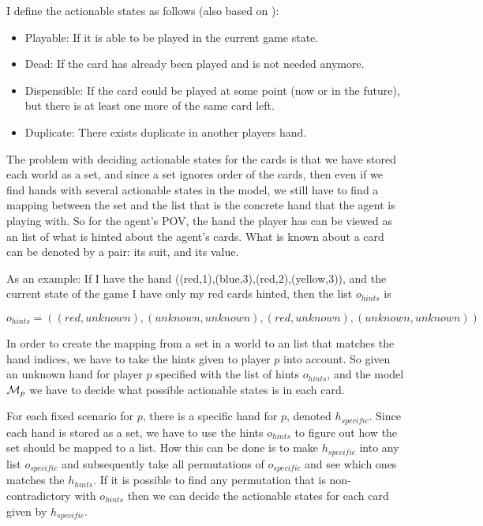 I define the actionable states as follows (also based on \cite{CoxEtAl2015}):
\begin{itemize}
	\item Playable: If it is able to be played in the current game state.
	\item Dead: If the card has already been played and is not needed anymore.
	\item Dispensible: If the card could be played at some point (now or in the future), but there is at least one more of the same card left.
	\item Duplicate: There exists duplicate in another players hand.
\end{itemize}

The problem with deciding actionable states for the cards is that we have stored each world as a set, and since a set ignores order of the cards, then even if we find hands with several actionable states in the model, we still have to find a mapping between the set and the list that is the concrete hand that the agent is playing with.
So for the agent's POV, the hand the player has can be viewed as an list of what is hinted about the agent's cards. What is known about a card can be denoted by a pair: its suit, and its value. 

As an example: If I have the hand ((red,1),(blue,3),(red,2),(yellow,3)), and the current state of the game I have only my red cards hinted, then the list $o_{hints}$ is

\[o_{hints} = ((red,unknown),(unknown,unknown),(red,unknown),(unknown,unknown))\]


In order to create the mapping from a set in a world to an list that matches the hand indices, we have to take the hints given to player $p$ into account.
So given an unknown hand for player $p$ specified with the list of hints $o_{hints}$, and the model $\mathcal{M}_p$ we have to decide what possible actionable states is in each card. 

For each fixed scenario for $p$, there is a specific hand for $p$, denoted $h_{specific}$. Since each hand is stored as a set, we have to use the hints $o_{hints}$ to figure out how the set should be mapped to a list. How this can be done is to make $h_{specific}$ into any list $o_{specific}$ and subsequently take all permutations of $o_{specific}$ and see which ones matches the $h_{hints}$. If it is possible to find any permutation that is non-contradictory with $o_{hints}$ then we can decide the actionable states for each card given by $h_{specific}$.


